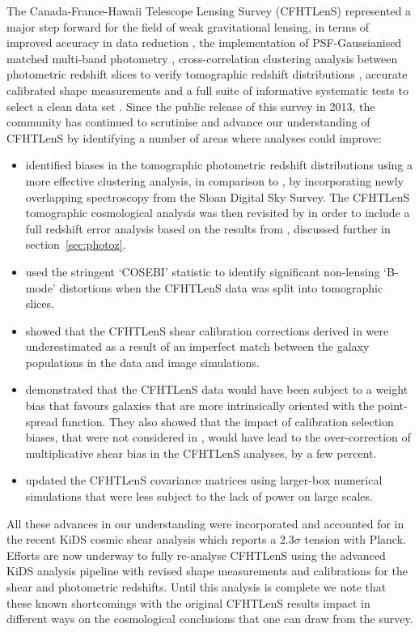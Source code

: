 The Canada-France-Hawaii Telescope Lensing Survey (CFHTLenS) represented a major step forward for the field of weak gravitational lensing, in terms of improved accuracy in data reduction \citep{erben/etal:2013}, the implementation of PSF-Gaussianised matched multi-band photometry \citep{hildebrandt/etal:2012}, cross-correlation clustering analysis between photometric redshift slices to verify tomographic redshift distributions \citep{benjamin/etal:2013}, accurate calibrated shape measurements \citep{miller/etal:2013} and a full suite of informative systematic tests to select a clean data set \citep{heymans/etal:2012}.    Since the public release of this survey in 2013, the community has continued to scrutinise and advance our understanding of CFHTLenS by identifying a number of areas where analyses could improve:
\begin{itemize}
\item{\citet{choi/etal:2016} identified biases in the tomographic photometric redshift distributions using a more effective clustering analysis, in comparison to \citet{benjamin/etal:2013}, by incorporating newly overlapping spectroscopy from the Sloan Digital Sky Survey.  The CFHTLenS tomographic cosmological analysis was then revisited by \citet{joudaki/etal:2016} in order to include a full redshift error analysis based on the results from \citet{choi/etal:2016}, discussed further in section~\ref{sec:photoz}.}
\item{\citet{asgari/etal:2016} used the stringent `COSEBI' statistic to identify significant non-lensing `B-mode' distortions when the CFHTLenS data was split into tomographic slices.}
\item{\citet{kuijken/etal:2015} showed that the CFHTLenS shear calibration corrections derived in \citet{miller/etal:2013} were underestimated as a result of an imperfect match between the galaxy populations in the data and image simulations.}
\item{\citet{fenechconti/etal:2016} demonstrated that the CFHTLenS data would have been subject to a weight bias that favours galaxies that are more intrinsically oriented with the point-spread function.  They also showed that the impact of calibration selection biases, that were not considered in \citet{miller/etal:2013}, would have lead to the over-correction of multiplicative shear bias in the CFHTLenS analyses, by a few percent.}
\item{\citet{joudaki/etal:2016} updated the CFHTLenS covariance matrices using larger-box numerical simulations that were less subject to the lack of power on large scales.}
\end{itemize}
All these advances in our understanding were incorporated and accounted for in the recent KiDS cosmic shear analysis \citep{hildebrandt/etal:2016} which reports a $2.3 \sigma$ tension with Planck.  Efforts are now underway to fully re-analyse CFHTLenS using the advanced KiDS analysis pipeline with revised shape measurements and calibrations for the shear and photometric redshifts.  Until this analysis is complete we note that these known shortcomings with the original CFHTLenS results impact in different ways on the cosmological conclusions that one can draw from the survey.


